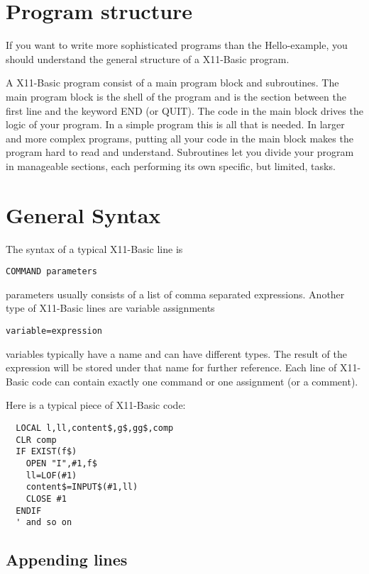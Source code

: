 \section{Program structure}

If you want to write more sophisticated programs than the Hello-example, you
should understand the general structure of a X11-Basic program.

A X11-Basic program consist of a main program block and subroutines. The
main program block is the shell of the program and is the section between
the first line and the keyword END (or QUIT). The code in the main block drives 
the logic of your program. In a simple program this is all that is needed. In
larger and more complex programs, putting all your code in the main block
makes the program hard to read and understand. Subroutines let you divide
your program in manageable sections, each performing its own specific, but
limited, tasks.

\section{General Syntax}

The syntax of a typical X11-Basic line is 
\begin{verbatim}
COMMAND parameters
\end{verbatim}
parameters usually consists of a list of comma separated expressions. 
Another type of X11-Basic lines are variable assignments
\begin{verbatim}
variable=expression
\end{verbatim}
variables typically have a name and can have different types. The result of the
expression will be stored under that name for further reference. 
Each line of X11-Basic code can contain exactly one command or one assignment 
(or a comment).

Here is a typical piece of X11-Basic code:

\begin{mdframed}[hidealllines=true,backgroundcolor=blue!20]
\begin{verbatim}
  LOCAL l,ll,content$,g$,gg$,comp
  CLR comp
  IF EXIST(f$)
    OPEN "I",#1,f$
    ll=LOF(#1)
    content$=INPUT$(#1,ll)
    CLOSE #1
  ENDIF
  ' and so on
\end{verbatim}
\end{mdframed}

\subsection*{Appending lines}


